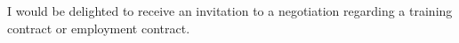 \versionLanguageStart%
		I would be delighted to receive an invitation to a negotiation regarding a training contract or employment contract.
\versionLanguageEnd